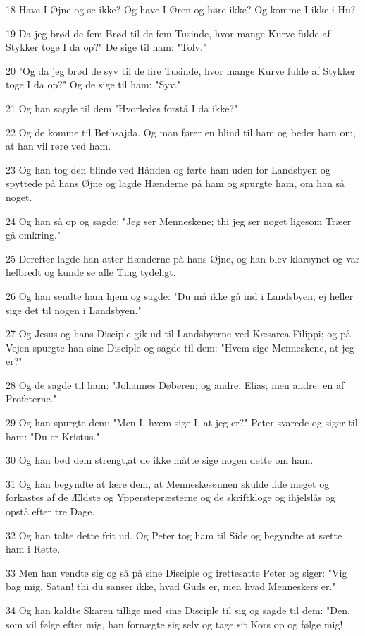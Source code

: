 \par 18 Have I Øjne og se ikke? Og have I Øren og høre ikke? Og komme I ikke i Hu?
\par 19 Da jeg brød de fem Brød til de fem Tusinde, hvor mange Kurve fulde af Stykker toge I da op?" De sige til ham: "Tolv."
\par 20 "Og da jeg brød de syv til de fire Tusinde, hvor mange Kurve fulde af Stykker toge I da op?" Og de sige til ham: "Syv."
\par 21 Og han sagde til dem "Hvorledes forstå I da ikke?"
\par 22 Og de komme til Bethsajda. Og man fører en blind til ham og beder ham om, at han vil røre ved ham.
\par 23 Og han tog den blinde ved Hånden og førte ham uden for Landsbyen og spyttede på hans Øjne og lagde Hænderne på ham og spurgte ham, om han så noget.
\par 24 Og han så op og sagde: "Jeg ser Menneskene; thi jeg ser noget ligesom Træer gå omkring."
\par 25 Derefter lagde han atter Hænderne på hans Øjne, og han blev klarsynet og var helbredt og kunde se alle Ting tydeligt.
\par 26 Og han sendte ham hjem og sagde: "Du må ikke gå ind i Landsbyen, ej heller sige det til nogen i Landsbyen."
\par 27 Og Jesus og hans Disciple gik ud til Landsbyerne ved Kæsarea Filippi; og på Vejen spurgte han sine Disciple og sagde til dem: "Hvem sige Menneskene, at jeg er?"
\par 28 Og de sagde til ham: "Johannes Døberen; og andre: Elias; men andre: en af Profeterne."
\par 29 Og han spurgte dem: "Men I, hvem sige I, at jeg er?" Peter svarede og siger til ham: "Du er Kristus."
\par 30 Og han bød dem strengt,at de ikke måtte sige nogen dette om ham.
\par 31 Og han begyndte at lære dem, at Menneskesønnen skulde lide meget og forkastes af de Ældste og Ypperstepræsterne og de skriftkloge og ihjelslås og opstå efter tre Dage.
\par 32 Og han talte dette frit ud. Og Peter tog ham til Side og begyndte at sætte ham i Rette.
\par 33 Men han vendte sig og så på sine Disciple og irettesatte Peter og siger: "Vig bag mig, Satan! thi du sanser ikke, hvad Guds er, men hvad Menneskers er."
\par 34 Og han kaldte Skaren tillige med sine Disciple til sig og sagde til dem: "Den, som vil følge efter mig, han fornægte sig selv og tage sit Kors op og følge mig!
